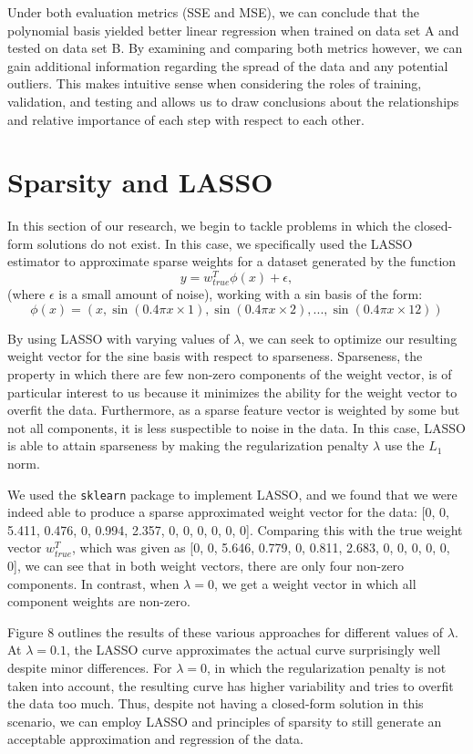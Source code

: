 \documentclass{article}
\begin{document}
Under both evaluation metrics (SSE and MSE), we can conclude that the polynomial basis yielded better linear regression when trained on data set A and tested on data set B. By examining and comparing both metrics however, we can gain additional information regarding the spread of the data and any potential outliers. This makes intuitive sense when considering the roles of training, validation, and testing and allows us to draw conclusions about the relationships and relative importance of each step with respect to each other.

\section{Sparsity and LASSO}
In this section of our research, we begin to tackle problems in which the closed-form solutions do not exist. In this case, we specifically used the LASSO estimator to approximate sparse weights for a dataset generated by the function
$$y = w^{T}_{true}\phi(x)+\epsilon,$$
(where $\epsilon$ is a small amount of noise), working with a sin basis of the form:
$$\phi(x) = (x, \sin(0.4\pi x \times 1), \sin(0.4\pi x \times 2), ... , \sin(0.4\pi x \times 12))$$

By using LASSO with varying values of $\lambda$, we can seek to optimize our resulting weight vector for the sine basis with respect to sparseness. Sparseness, the property in which there are few non-zero components of the weight vector, is of particular interest to us because it minimizes the ability for the weight vector to overfit the data. Furthermore, as a sparse feature vector is weighted by some but not all components, it is less suspectible to noise in the data. In this case, LASSO is able to attain sparseness by making the regularization penalty $\lambda$ use the $L_1$ norm.

We used the \texttt{sklearn} package to implement LASSO, and we found that we were indeed able to produce a sparse approximated weight vector for the data: [0, 0, 5.411, 0.476, 0, 0.994, 2.357, 0, 0, 0, 0, 0, 0]. Comparing this with the true weight vector $w^{T}_{true}$, which was given as [0, 0, 5.646, 0.779, 0, 0.811, 2.683, 0, 0, 0, 0, 0, 0], we can see that in both weight vectors, there are only four non-zero components. In contrast, when $\lambda = 0$, we get a weight vector in which all component weights are non-zero.

Figure 8 outlines the results of these various approaches for different values of $\lambda$. At $\lambda = 0.1$, the LASSO curve approximates the actual curve surprisingly well despite minor differences. For $\lambda = 0$, in which the regularization penalty is not taken into account, the resulting curve has higher variability and tries to overfit the data too much. Thus, despite not having a closed-form solution in this scenario, we can employ LASSO and principles of sparsity to still generate an acceptable approximation and regression of the data.
\end{document}
